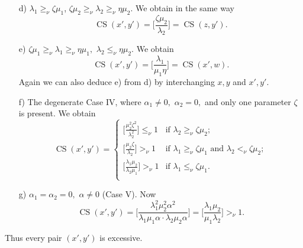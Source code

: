 \documentclass [12pt,a4paper,reqno]{amsart}
\begin{document}
\begin{enumerate}
  \item[d)] ${\lambda}_1 {\geq_\nu} {\zeta} \mu_1$, ${\zeta} \mu_2 {\geq_\nu} {\lambda}_2 {\geq_\nu} \eta \mu_2.$  We obtain in the same way
\begin{equation}\label{eq:II.7.26}
{\operatorname{CS}}(x',y') = \bigg[ \frac{{\zeta}  \mu_2 }{ {\lambda}_2} \bigg]  = {\operatorname{CS}}(z,y').
\end{equation}
{\vskip 1.5mm \noindent}

  \item[e)] ${\zeta} \mu_1 {\geq_\nu} {\lambda}_1 {\geq_\nu} \eta \mu_1,$ ${\lambda}_2 {\leq_\nu} \eta \mu_2$. We obtain
\begin{equation}\label{eq:II.7.27}
{\operatorname{CS}}(x',y') = \bigg[ \frac{{\lambda}_1 }{ \mu_1 \eta} \bigg]  = {\operatorname{CS}}(x',w).
\end{equation}
Again we can also deduce e) from d) by interchanging $x,y$ and $x',y'$.
{\vskip 1.5mm \noindent}

  \item[f)] The degenerate Case  IV, where ${\alpha}_1 \neq 0,$ ${\alpha}_2 = 0,$ and only one parameter ${\zeta}$ is present. We obtain
\begin{equation}\label{eq:II.7.28}
{\operatorname{CS}}(x',y') =
\left\{
  \begin{array}{ll}
    \big[ \frac{  \mu_2 ^2 {\zeta}^2}{ {\lambda}_2^2} \big]  {\leq_\nu} 1  & \text{if } {\lambda}_2 {\geq_\nu} {\zeta} \mu_2; \\[2mm ]
        \big[ \frac{  \mu_2  {\zeta}}{ {\lambda}_2} \big]  {>_\nu} 1  & \text{if } {\lambda}_1 {\geq_\nu} {\zeta} \mu_1 \text{ and } {\lambda}_2 {<_\nu} {\zeta} \mu_2 ; \\[2mm]
        \big[ \frac{  {\lambda}_1 \mu_2}{ {\lambda}_2  \mu_1 } \big]  {>_\nu} 1  & \text{if } {\lambda}_1 {\leq_\nu} {\zeta} \mu_1.  \\
  \end{array}
\right.
\end{equation}
{\vskip 1.5mm \noindent}

  \item[g)] ${\alpha}_1 = {\alpha}_2 = 0,$  ${\alpha} \neq 0$ (Case V). Now
\begin{equation}\label{eq:II.7.29}
{\operatorname{CS}}(x',y') = \bigg[ \frac{{\lambda}_1 ^2  \mu_2 ^2 {\alpha}^2}{{\lambda}_1 \mu_1 {\alpha}  \cdot {\lambda}_2    \mu_2 {\alpha}  } \bigg]  =
\bigg[ \frac{ {\lambda}_1 \mu_2 }{\mu_1 {\lambda}_2 } \bigg] {>_\nu} 1.
\end{equation}
\end{enumerate}
Thus every pair $(x',y')$ is excessive.
{\vskip 1.5mm \noindent}
\end{document}
